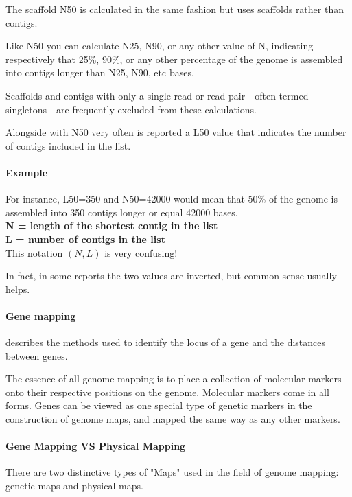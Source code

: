 The scaffold N50 is calculated in the same fashion but uses scaffolds rather
than contigs.

Like N50 you can calculate N25, N90, or any other value of N, indicating
respectively that 25\%, 90\%, or any other percentage of the genome is
assembled into contigs longer than N25, N90, etc bases.

Scaffolds and contigs with only a single read or read pair - often termed
singletons - are frequently excluded from these calculations.

Alongside with N50 very often is reported a L50 value that indicates the
number of contigs included in the list.

\paragraph*{Example} For instance, L50=350 and N50=42000 would mean that 50\%
of the genome is assembled into 350 contigs longer or equal 42000 bases. \\

\textbf{N = length of the shortest contig in the list} \\

\textbf{L = number of contigs in the list} \\

This notation $(N, L)$ is very confusing!

In fact, in some reports the two values are inverted, but common sense usually
helps. \\

\paragraph*{Gene mapping} describes the methods used to identify the locus of
a gene and the distances between genes.

The essence of all genome mapping is to place a collection of molecular
markers onto their respective positions on the genome.
Molecular markers come in all forms.
Genes can be viewed as one special type of genetic markers in the construction
of genome maps, and mapped the same way as any other markers. \\

\paragraph*{Gene Mapping VS Physical Mapping}
There are two distinctive types of "Maps" used in the field of genome mapping:
genetic maps and physical maps.

